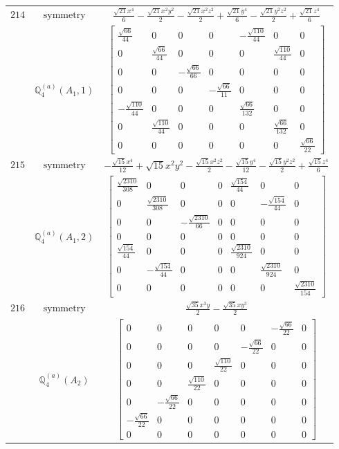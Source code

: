 \documentclass[fleqn,8pt,landscape]{jsarticle}
\begin{document}
\begin{longtable}{ccc}
$ 214 $ & $ \text{symmetry} $ & $ \frac{\sqrt{21} x^{4}}{6} - \frac{\sqrt{21} x^{2} y^{2}}{2} - \frac{\sqrt{21} x^{2} z^{2}}{2} + \frac{\sqrt{21} y^{4}}{6} - \frac{\sqrt{21} y^{2} z^{2}}{2} + \frac{\sqrt{21} z^{4}}{6} $ \\
$  $ & $ \mathbb{Q}_{4}^{(a)}(A_{1},1) $ & $ \begin{bmatrix} \frac{\sqrt{66}}{44} & 0 & 0 & 0 & - \frac{\sqrt{110}}{44} & 0 & 0 \\ 0 & \frac{\sqrt{66}}{44} & 0 & 0 & 0 & \frac{\sqrt{110}}{44} & 0 \\ 0 & 0 & - \frac{\sqrt{66}}{66} & 0 & 0 & 0 & 0 \\ 0 & 0 & 0 & - \frac{\sqrt{66}}{11} & 0 & 0 & 0 \\ - \frac{\sqrt{110}}{44} & 0 & 0 & 0 & \frac{\sqrt{66}}{132} & 0 & 0 \\ 0 & \frac{\sqrt{110}}{44} & 0 & 0 & 0 & \frac{\sqrt{66}}{132} & 0 \\ 0 & 0 & 0 & 0 & 0 & 0 & \frac{\sqrt{66}}{22} \end{bmatrix} $ \\ \hline
$ 215 $ & $ \text{symmetry} $ & $ - \frac{\sqrt{15} x^{4}}{12} + \sqrt{15} x^{2} y^{2} - \frac{\sqrt{15} x^{2} z^{2}}{2} - \frac{\sqrt{15} y^{4}}{12} - \frac{\sqrt{15} y^{2} z^{2}}{2} + \frac{\sqrt{15} z^{4}}{6} $ \\
$  $ & $ \mathbb{Q}_{4}^{(a)}(A_{1},2) $ & $ \begin{bmatrix} \frac{\sqrt{2310}}{308} & 0 & 0 & 0 & \frac{\sqrt{154}}{44} & 0 & 0 \\ 0 & \frac{\sqrt{2310}}{308} & 0 & 0 & 0 & - \frac{\sqrt{154}}{44} & 0 \\ 0 & 0 & - \frac{\sqrt{2310}}{66} & 0 & 0 & 0 & 0 \\ 0 & 0 & 0 & 0 & 0 & 0 & 0 \\ \frac{\sqrt{154}}{44} & 0 & 0 & 0 & \frac{\sqrt{2310}}{924} & 0 & 0 \\ 0 & - \frac{\sqrt{154}}{44} & 0 & 0 & 0 & \frac{\sqrt{2310}}{924} & 0 \\ 0 & 0 & 0 & 0 & 0 & 0 & \frac{\sqrt{2310}}{154} \end{bmatrix} $ \\ \hline
$ 216 $ & $ \text{symmetry} $ & $ \frac{\sqrt{35} x^{3} y}{2} - \frac{\sqrt{35} x y^{3}}{2} $ \\
$  $ & $ \mathbb{Q}_{4}^{(a)}(A_{2}) $ & $ \begin{bmatrix} 0 & 0 & 0 & 0 & 0 & - \frac{\sqrt{66}}{22} & 0 \\ 0 & 0 & 0 & 0 & - \frac{\sqrt{66}}{22} & 0 & 0 \\ 0 & 0 & 0 & \frac{\sqrt{110}}{22} & 0 & 0 & 0 \\ 0 & 0 & \frac{\sqrt{110}}{22} & 0 & 0 & 0 & 0 \\ 0 & - \frac{\sqrt{66}}{22} & 0 & 0 & 0 & 0 & 0 \\ - \frac{\sqrt{66}}{22} & 0 & 0 & 0 & 0 & 0 & 0 \\ 0 & 0 & 0 & 0 & 0 & 0 & 0 \end{bmatrix} $ \\ \hline

\end{longtable}
\end{document}
